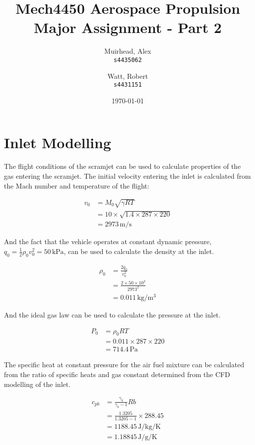 \documentclass[a4paper]{article}
\title{
	\Large {\sc Mech}4450 Aerospace Propulsion \\
	\Huge Major Assignment - Part 2
}
\author{
	Muirhead, Alex \\ \texttt{s4435062}
	\and
	Watt, Robert \\ \texttt{s4431151}
}
\date{\today}
\begin{document}
\maketitle


\vspace{10em}

\newpage
{}


\section{Inlet Modelling}
The flight conditions of the scramjet can be used to calculate properties of the gas entering the scramjet. The initial velocity entering the inlet is calculated from the Mach number and temperature of the flight:

\begin{align}
    v_0 &= M_0 \sqrt{\gamma R T}\\
    &= 10 \times \sqrt{1.4 \times 287 \times 220}\\
    &= 2973 \, \mathrm{m/s}
\end{align}

And the fact that the vehicle operates at constant dynamic pressure, \(q_0 = \frac{1}{2}\rho_0v_0^2 = 50 \, \mathrm{kPa}\), can be used to calculate the density at the inlet.

\begin{align}
    \rho_0 &= \frac{2 q_0}{v_0^2}\\
    &= \frac{2 \times 50 \times 10^3}{2973^2}\\
    &= 0.011 \, \mathrm{kg/m^3}
\end{align}

And the ideal gas law can be used to calculate the pressure at the inlet.

\begin{align}
    P_0 &= \rho_0 R T\\
    &= 0.011 \times 287 \times 220\\
    &= 714.4 \, \mathrm{Pa}
\end{align}

The specific heat at constant pressure for the air fuel mixture can be calculated from the ratio of specific heats and gas constant determined from the CFD modelling of the inlet.

\begin{align}
    c_{pb} &= \frac{\gamma_b}{\gamma_b - 1}Rb\\
    &= \frac{1.3205}{1.3205 - 1}\times 288.45\\
    &= 1188.45 \, \mathrm{J/kg/K}\\
    &= 1.18845 \, \mathrm{J/g/K}
\end{align}
\end{document}
